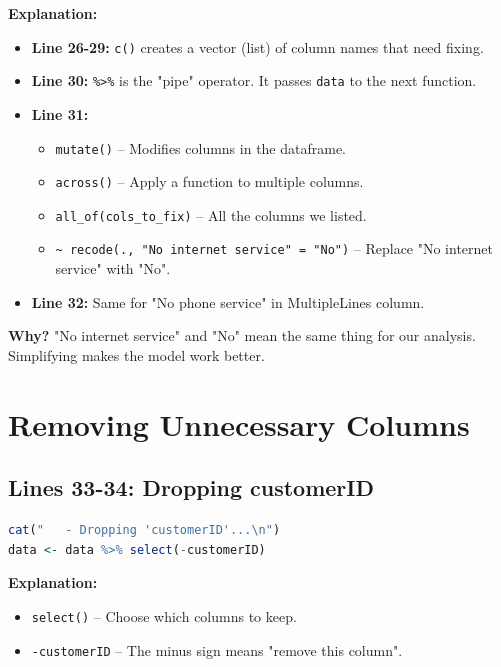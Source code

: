 \documentclass[12pt,a4paper]{article}
\begin{document}
\textbf{Explanation:}
\begin{itemize}
    \item \textbf{Line 26-29:} \texttt{c()} creates a vector (list) of column names that need fixing.
    \item \textbf{Line 30:} \texttt{\%>\%} is the "pipe" operator. It passes \texttt{data} to the next function.
    \item \textbf{Line 31:} 
    \begin{itemize}
        \item \texttt{mutate()} -- Modifies columns in the dataframe.
        \item \texttt{across()} -- Apply a function to multiple columns.
        \item \texttt{all\_of(cols\_to\_fix)} -- All the columns we listed.
        \item \texttt{\~{} recode(., "No internet service" = "No")} -- Replace "No internet service" with "No".
    \end{itemize}
    \item \textbf{Line 32:} Same for "No phone service" in MultipleLines column.
\end{itemize}

\textbf{Why?} "No internet service" and "No" mean the same thing for our analysis. Simplifying makes the model work better.

\section{Removing Unnecessary Columns}

\subsection{Lines 33-34: Dropping customerID}

\begin{lstlisting}[language=R]
cat("   - Dropping 'customerID'...\n")
data <- data %>% select(-customerID)
\end{lstlisting}

\textbf{Explanation:}
\begin{itemize}
    \item \texttt{select()} -- Choose which columns to keep.
    \item \texttt{-customerID} -- The minus sign means "remove this column".
\end{itemize}
\end{document}
